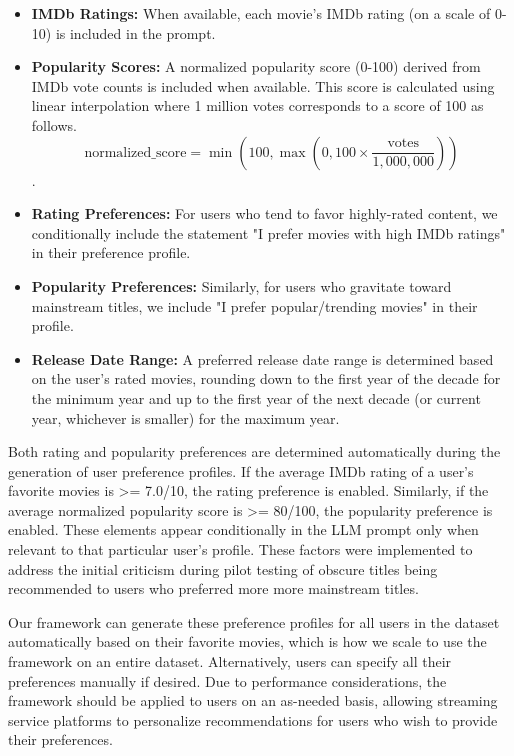 \documentclass[sigconf]{acmart}
\begin{document}
\begin{itemize}
    \item \textbf{IMDb Ratings:} When available, each movie's IMDb rating (on a scale of 0-10) is included in the prompt.
    \item \textbf{Popularity Scores:} A normalized popularity score (0-100) derived from IMDb vote counts is included when available. This score is calculated using linear interpolation where 1 million votes corresponds to a score of 100 as follows. 
    \begin{equation}
        \text{normalized\_score} = \min(100, \max(0, 100 \times \frac{\text{votes}}{1{,}000{,}000}))
    \end{equation}.
    \item \textbf{Rating Preferences:} For users who tend to favor highly-rated content, we conditionally include the statement "I prefer movies with high IMDb ratings" in their preference profile.
    \item \textbf{Popularity Preferences:} Similarly, for users who gravitate toward mainstream titles, we include "I prefer popular/trending movies" in their profile.
    \item \textbf{Release Date Range:} A preferred release date range is determined based on the user's rated movies, rounding down to the first year of the decade for the minimum year and up to the first year of the next decade (or current year, whichever is smaller) for the maximum year.
\end{itemize}

Both rating and popularity preferences are determined automatically during the generation of user preference profiles. If the average IMDb rating of a user's favorite movies is >= 7.0/10, the rating preference is enabled. Similarly, if the average normalized popularity score is >= 80/100, the popularity preference is enabled. These elements appear conditionally in the LLM prompt only when relevant to that particular user's profile. These factors were implemented to address the initial criticism during pilot testing of obscure titles being recommended to users who preferred more more mainstream titles.

Our framework can generate these preference profiles for all users in the dataset automatically based on their favorite movies, which is how we scale to use the framework on an entire dataset. Alternatively, users can specify all their preferences manually if desired. Due to performance considerations, the framework should be applied to users on an as-needed basis, allowing streaming service platforms to personalize recommendations for users who wish to provide their preferences.
\end{document}
